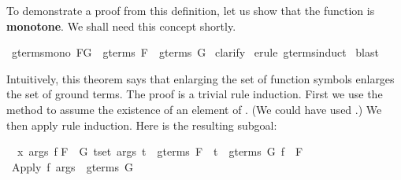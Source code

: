 \begin{isabellebody}
\begin{isamarkuptext}%
To demonstrate a proof from this definition, let us 
show that the function 
is \textbf{monotone}.  We shall need this concept shortly.%
\end{isamarkuptext}%
\isamarkuptrue%
\isamarkupfalse%
\ gterms{}mono{}\ {}F{}G\ {}\ gterms\ F\ {}\ gterms\ G{}\isanewline
%
\isadelimproof
%
\endisadelimproof
%
\isatagproof
{}\isamarkupfalse%
\ clarify\isanewline
{}\isamarkupfalse%
\ {}erule\ gterms{}induct{}\isanewline
{}\isamarkupfalse%
\ blast\isanewline
{}\isamarkupfalse%
%
\endisatagproof
{\isafoldproof}%
%
\isadelimproof
%
\endisadelimproof
%
\isadelimproof
%
\endisadelimproof
%
\isatagproof
%
\begin{isamarkuptxt}%
Intuitively, this theorem says that
enlarging the set of function symbols enlarges the set of ground 
terms. The proof is a trivial rule induction.
First we use the  method to assume the existence of an element of
.  (We could have used .)  We then
apply rule induction. Here is the resulting subgoal:
\begin{isabelle}%
\ {}{}\ {}x\ args\ f{}\isanewline
{}F\ {}\ G{}\ {}t{}set\ args{}\ t\ {}\ gterms\ F\ {}\ t\ {}\ gterms\ G{}\ f\ {}\ F{}\isanewline
{}\ Apply\ f\ args\ {}\ gterms\ G%

\end{isabelle}
\end{isamarkuptxt}
\end{isabellebody}
